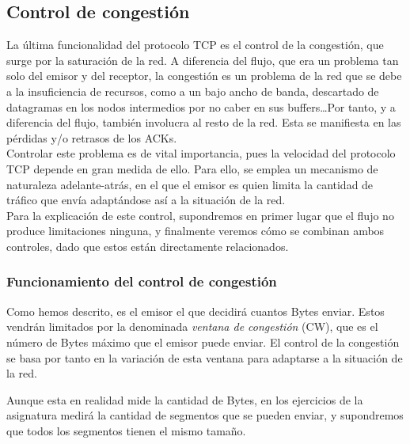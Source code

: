 \subsection{Control de congestión}

La última funcionalidad del protocolo \acrshort{TCP} es el control de la congestión, que surge por la saturación de la red. A diferencia del flujo, que era un problema tan solo del emisor y del receptor, la congestión es un problema de la red que se debe a la insuficiencia de recursos, como a un bajo ancho de banda, descartado de datagramas en los nodos intermedios por no caber en sus buffers\dots Por tanto, y a diferencia del flujo, también involucra al resto de la red. Esta se manifiesta en las pérdidas y/o retrasos de los \acrshort{ACK}s.\\

Controlar este problema es de vital importancia, pues la velocidad del protocolo \acrshort{TCP} depende en gran medida de ello. Para ello, se emplea un mecanismo de naturaleza adelante-atrás, en el que el emisor es quien limita la cantidad de tráfico que envía adaptándose así a la situación de la red.\\

Para la explicación de este control, supondremos en primer lugar que el flujo no produce limitaciones ninguna, y finalmente veremos cómo se combinan ambos controles, dado que estos están directamente relacionados.

\subsubsection{Funcionamiento del control de congestión}

Como hemos descrito, es el emisor el que decidirá cuantos Bytes enviar. Estos vendrán limitados por la denominada \emph{ventana de congestión} (\acrfull{CW}), que es el número de Bytes máximo que el emisor puede enviar. El control de la congestión se basa por tanto en la variación de esta ventana para adaptarse a la situación de la red.
\begin{observacion}
    Aunque esta en realidad mide la cantidad de Bytes, en los ejercicios de la asignatura medirá la cantidad de segmentos que se pueden enviar, y supondremos que todos los segmentos tienen el mismo tamaño.
\end{observacion}

